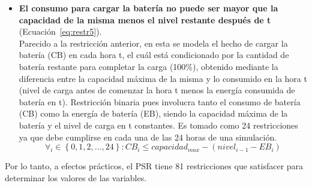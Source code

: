 \begin{itemize}
\item \textbf{El consumo para cargar la batería no puede ser mayor que la capacidad de la misma menos el nivel restante después de t} (Ecuación~\ref{eq:restr5}).\\Parecido a la restricción anterior, en esta se modela el hecho de cargar la batería (CB) en cada hora t, el cuál está condicionado por la cantidad de batería restante para completar la carga (100\%), obtenido mediante la diferencia entre la capacidad máxima de la misma y lo consumido en la hora t (nivel de carga antes de comenzar la hora t menos la energía consumida de batería en t). Restricción binaria pues involucra tanto el consumo de batería (CB) como la energía de batería (EB), siendo la capacidad máxima de la batería y el nivel de carga en t constantes. Es tomado como 24 restricciones ya que debe cumplirse en cada una de las 24 horas de una simulación.
\begin{equation}
        \label{eq:restr5}
        \forall_{i} \in \left\{ 0, 1, 2, ..., 24 \right\} : CB_{i} \leq capacidad_{max}- (nivel_{i-1} - EB_{i})
\end{equation}

\end{itemize}

Por lo tanto, a efectos prácticos, el PSR tiene 81 restricciones que satisfacer para determinar los valores de las variables.

